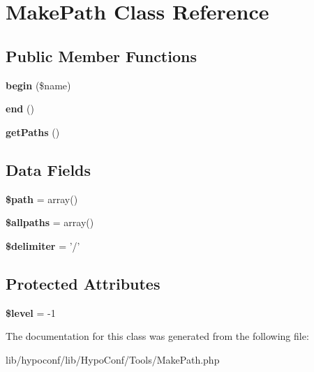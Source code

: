 \hypertarget{class_tools_1_1_make_path}{
\section{\-Make\-Path \-Class \-Reference}
\label{class_tools_1_1_make_path}
}
\subsection*{\-Public \-Member \-Functions}
\begin{DoxyCompactItemize}
\item 
\hypertarget{class_tools_1_1_make_path_a9b9faf97c2bd054669d522c34315d494}{
{\bfseries begin} (\$name)}
\label{class_tools_1_1_make_path_a9b9faf97c2bd054669d522c34315d494}

\item 
\hypertarget{class_tools_1_1_make_path_a817082ace0e2589d27b22890290aa4a9}{
{\bfseries end} ()}
\label{class_tools_1_1_make_path_a817082ace0e2589d27b22890290aa4a9}

\item 
\hypertarget{class_tools_1_1_make_path_a3872a8fe71c89ed326681ef568e5498a}{
{\bfseries get\-Paths} ()}
\label{class_tools_1_1_make_path_a3872a8fe71c89ed326681ef568e5498a}

\end{DoxyCompactItemize}
\subsection*{\-Data \-Fields}
\begin{DoxyCompactItemize}
\item 
\hypertarget{class_tools_1_1_make_path_a0a4baf0b22973c07685c3981f0d17fc4}{
{\bfseries \$path} = array()}
\label{class_tools_1_1_make_path_a0a4baf0b22973c07685c3981f0d17fc4}

\item 
\hypertarget{class_tools_1_1_make_path_a5cb3eabd5c1eea08e87f8de7478a8ac6}{
{\bfseries \$allpaths} = array()}
\label{class_tools_1_1_make_path_a5cb3eabd5c1eea08e87f8de7478a8ac6}

\item 
\hypertarget{class_tools_1_1_make_path_a40acc7b8c08cfbb456cd9444cb0e8f61}{
{\bfseries \$delimiter} = '/'}
\label{class_tools_1_1_make_path_a40acc7b8c08cfbb456cd9444cb0e8f61}

\end{DoxyCompactItemize}
\subsection*{\-Protected \-Attributes}
\begin{DoxyCompactItemize}
\item 
\hypertarget{class_tools_1_1_make_path_abd32cc82c6a3f79491987de36ad580ca}{
{\bfseries \$level} = -\/1}
\label{class_tools_1_1_make_path_abd32cc82c6a3f79491987de36ad580ca}

\end{DoxyCompactItemize}


\-The documentation for this class was generated from the following file\-:\begin{DoxyCompactItemize}
\item 
lib/hypoconf/lib/\-Hypo\-Conf/\-Tools/\-Make\-Path.\-php\end{DoxyCompactItemize}
